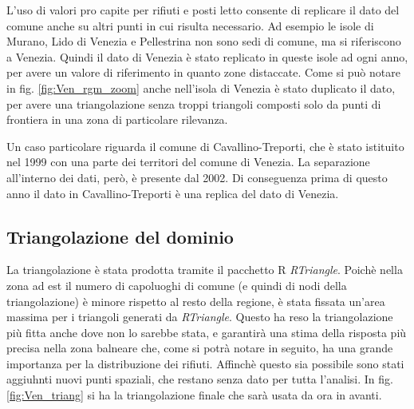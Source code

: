 \documentclass[a4paper,11pt,twoside,openright]{book}							%
\begin{document}
L'uso di valori pro capite per rifiuti e posti letto consente di replicare il dato del comune anche su altri punti in cui risulta necessario. Ad esempio le isole di Murano, Lido di Venezia e Pellestrina non sono sedi di comune, ma si riferiscono a Venezia. Quindi il dato di Venezia è stato replicato in queste isole ad ogni anno, per avere un valore di riferimento in quanto zone distaccate. Come si può notare in fig. \ref{fig:Ven_rgm_zoom} anche nell'isola di Venezia è stato duplicato il dato, per avere una triangolazione  senza troppi triangoli composti solo da punti di frontiera in una zona di particolare rilevanza.

Un caso particolare riguarda il comune di Cavallino-Treporti, che è stato istituito nel 1999 con una parte dei territori del comune di Venezia. La separazione all'interno dei dati, però, è presente dal 2002. Di conseguenza prima di questo anno il dato in Cavallino-Treporti è una replica del dato di Venezia.

\subsection{Triangolazione del dominio}

La triangolazione è stata prodotta tramite il pacchetto R \textit{RTriangle}. Poichè nella zona ad est il numero di capoluoghi di comune (e quindi di nodi della triangolazione) è minore rispetto al resto della regione, è stata fissata un'area massima per i triangoli generati da \textit{RTriangle}. Questo ha reso la triangolazione più fitta anche dove non lo sarebbe stata, e garantirà una stima della risposta più precisa nella zona balneare che, come si potrà notare in seguito, ha una grande importanza per la distribuzione dei rifiuti. Affinchè questo sia possibile sono stati aggiuhnti nuovi punti spaziali, che restano senza dato per tutta l'analisi. In fig. \ref{fig:Ven_triang} si ha la triangolazione finale che sarà usata da ora in avanti.
\end{document}
